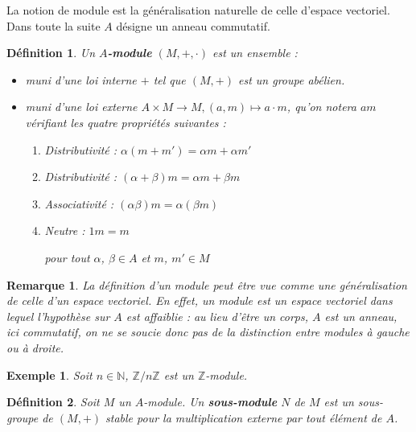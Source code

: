 \documentclass[a4paper,12pt]{report}  %
\theoremstyle{definitionstyle}
\newtheorem{definition}{Définition}[chapter] %
\theoremstyle{examplestyle}
\newtheorem{example}{Exemple}[chapter] %
\theoremstyle{remarkstyle}
\newtheorem{remark}{Remarque}[chapter] %
\theoremstyle{propositionstyle}
\theoremstyle{theoremstyle}
\begin{document}
	La notion de module est la généralisation naturelle de celle d'espace vectoriel. Dans toute la suite $A$ désigne un anneau commutatif.
	
	\begin{definition}
		Un \textbf{$A$-module} $(M, +, \cdot)$ est un ensemble :
		
		\begin{itemize}
			\item muni d'une loi interne $+$ tel que $(M, +)$ est un groupe abélien.
			\item muni d'une loi externe $A \times M \rightarrow M, (a, m) \mapsto a \cdot m$, qu'on notera $am$ vérifiant les quatre propriétés suivantes :
			\begin{enumerate}
				\item Distributivité : $\alpha(m + m') = \alpha m + \alpha m'$
				\item Distributivité : $(\alpha+\beta)m = \alpha m + \beta m$
				\item Associativité : $(\alpha \beta)m = \alpha(\beta m)$
				\item Neutre : $1m = m$
				
				pour tout $\alpha$, $\beta \in A$ et $m$, $m' \in M$
			\end{enumerate}
		\end{itemize}
	\end{definition}
	
	\begin{remark}
		La définition d'un module peut être vue comme une généralisation de celle d'un espace vectoriel. En effet, un module est un espace vectoriel dans lequel l'hypothèse sur $A$ est affaiblie : au lieu d'être un corps, $A$ est un anneau, ici commutatif, on ne se soucie donc pas de la distinction entre modules à gauche ou à droite.
	\end{remark}

	
	\begin{example}
		Soit $n \in \mathbb{N}$, $\mathbb{Z}/n \mathbb{Z}$ est un $\mathbb{Z}$-module.
	\end{example}

	\begin{definition}
		Soit $M$ un $A$-module. Un \textbf{sous-module} $N$ de $M$ est un sous-groupe de $(M, +)$ stable pour la multiplication externe par tout élément de $A$.
	\end{definition}
\end{document}
